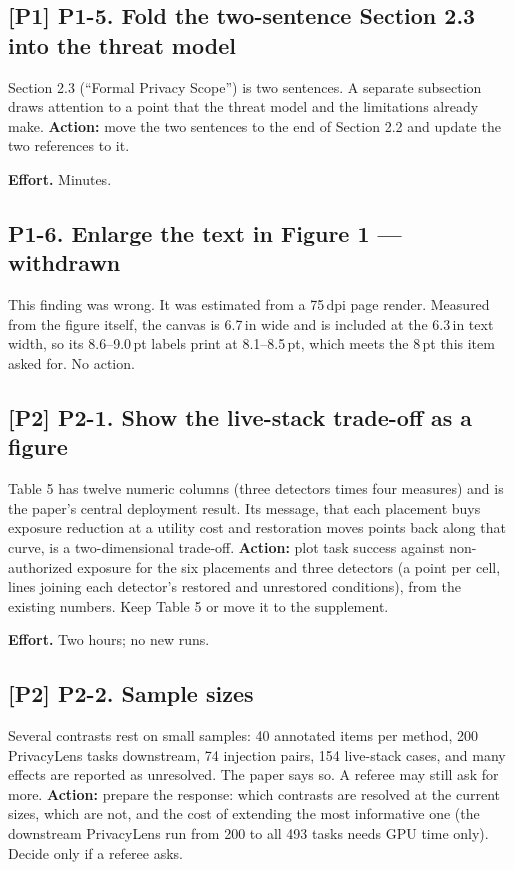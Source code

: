\documentclass[10pt]{article}
\newcommand{\po}{\textbf{[P1]}}
\newcommand{\pt}{\textbf{[P2]}}
\newcommand{\effort}[1]{\par\noindent\textbf{Effort.} #1}
\begin{document}
\subsection*{\po{} P1-5. Fold the two-sentence Section 2.3 into the threat model}
Section 2.3 (``Formal Privacy Scope'') is two sentences. A separate subsection draws attention to a point that the
threat model and the limitations already make.
\textbf{Action:} move the two sentences to the end of Section 2.2 and update the two references to it.
\effort{Minutes.}

\subsection*{P1-6. Enlarge the text in Figure 1 --- withdrawn}
This finding was wrong. It was estimated from a 75\,dpi page render. Measured from the figure itself, the canvas is
6.7\,in wide and is included at the 6.3\,in text width, so its 8.6--9.0\,pt labels print at 8.1--8.5\,pt, which meets
the 8\,pt this item asked for. No action.

\subsection*{\pt{} P2-1. Show the live-stack trade-off as a figure}
Table 5 has twelve numeric columns (three detectors times four measures) and is the paper's central deployment
result. Its message, that each placement buys exposure reduction at a utility cost and restoration moves points back
along that curve, is a two-dimensional trade-off.
\textbf{Action:} plot task success against non-authorized exposure for the six placements and three detectors (a
point per cell, lines joining each detector's restored and unrestored conditions), from the existing numbers. Keep
Table 5 or move it to the supplement.
\effort{Two hours; no new runs.}

\subsection*{\pt{} P2-2. Sample sizes}
Several contrasts rest on small samples: 40 annotated items per method, 200 PrivacyLens tasks downstream, 74
injection pairs, 154 live-stack cases, and many effects are reported as unresolved. The paper says so. A referee may
still ask for more.
\textbf{Action:} prepare the response: which contrasts are resolved at the current sizes, which are not, and the
cost of extending the most informative one (the downstream PrivacyLens run from 200 to all 493 tasks needs GPU time
only). Decide only if a referee asks.
\end{document}
